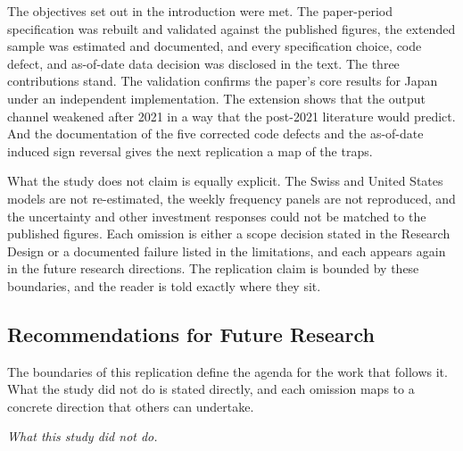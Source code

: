 The objectives set out in the introduction were met. The paper-period specification was rebuilt and validated against the published figures, the extended sample was estimated and documented, and every specification choice, code defect, and as-of-date data decision was disclosed in the text. The three contributions stand. The validation confirms the paper's core results for Japan under an independent implementation. The extension shows that the output channel weakened after 2021 in a way that the post-2021 literature would predict. And the documentation of the five corrected code defects and the as-of-date induced sign reversal gives the next replication a map of the traps.

What the study does not claim is equally explicit. The Swiss and United States models are not re-estimated, the weekly frequency panels are not reproduced, and the uncertainty and other investment responses could not be matched to the published figures. Each omission is either a scope decision stated in the Research Design or a documented failure listed in the limitations, and each appears again in the future research directions. The replication claim is bounded by these boundaries, and the reader is told exactly where they sit.

\subsection{Recommendations for Future Research}

The boundaries of this replication define the agenda for the work that follows it. What the study did not do is stated directly, and each omission maps to a concrete direction that others can undertake.

\textit{What this study did not do.}

